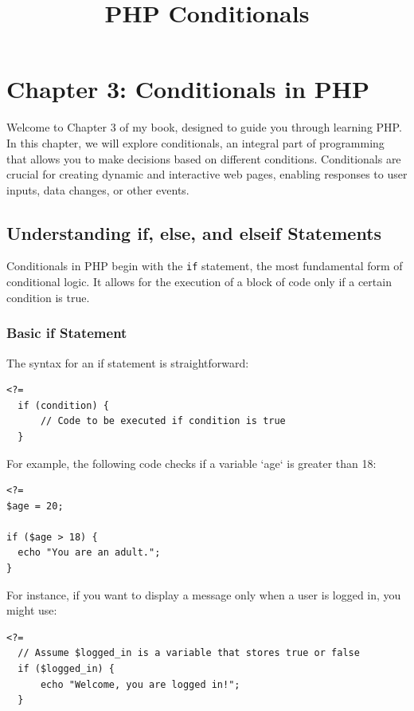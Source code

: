 \documentclass[11pt]{article}
\date{}
\title{PHP Conditionals}
\begin{document}
\maketitle
\setcounter{tocdepth}{3}
\tableofcontents

\setlength\parindent{10pt}
\section{Chapter 3: Conditionals in PHP}
\label{sec:org0a3a03f}
Welcome to Chapter 3 of my book, designed to guide you through learning
PHP. In this chapter, we will explore conditionals, an integral part of
programming that allows you to make decisions based on different
conditions. Conditionals are crucial for creating dynamic and
interactive web pages, enabling responses to user inputs, data changes,
or other events.

\subsection{Understanding if, else, and elseif Statements}
\label{sec:org4c9a7c3}
Conditionals in PHP begin with the \texttt{if} statement, the most fundamental
form of conditional logic. It allows for the execution of a block of
code only if a certain condition is true.

\subsubsection{Basic if Statement}
\label{sec:org14b100b}
The syntax for an if statement is straightforward:

\begin{verbatim}
<?=
  if (condition) {
      // Code to be executed if condition is true
  }
\end{verbatim}

For example, the following code checks if a variable `age` is greater than 18:

\begin{verbatim}
<?=
$age = 20;

if ($age > 18) {
  echo "You are an adult.";
}
\end{verbatim}


For instance, if you want to display a message only when a user is
logged in, you might use:

\begin{verbatim}
<?=
  // Assume $logged_in is a variable that stores true or false
  if ($logged_in) {
      echo "Welcome, you are logged in!";
  }
\end{verbatim}
\end{document}
